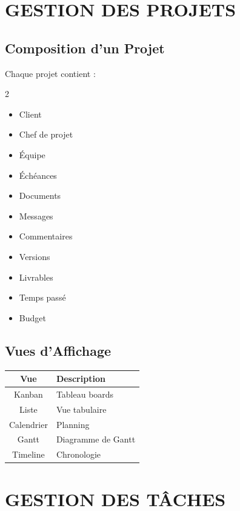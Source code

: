 \documentclass[12pt,a4paper,oneside]{book}
\begin{document}
\chapter{GESTION DES PROJETS}

\section{Composition d'un Projet}
Chaque projet contient :
\begin{multicols}{2}
\begin{itemize}
\item Client
\item Chef de projet
\item Équipe
\item Échéances
\item Documents
\item Messages
\item Commentaires
\item Versions
\item Livrables
\item Temps passé
\item Budget
\end{itemize}
\end{multicols}

\section{Vues d'Affichage}
\begin{center}
\begin{tabular}{|c|p{10cm}|}
\hline
\rowcolor{electronblue}
\color{white}\textbf{Vue} & \color{white}\textbf{Description} \\
\hline
Kanban & Tableau boards \\
\hline
Liste & Vue tabulaire \\
\hline
Calendrier & Planning \\
\hline
Gantt & Diagramme de Gantt \\
\hline
Timeline & Chronologie \\
\hline
\end{tabular}
\end{center}

\chapter{GESTION DES TÂCHES}
\end{document}

